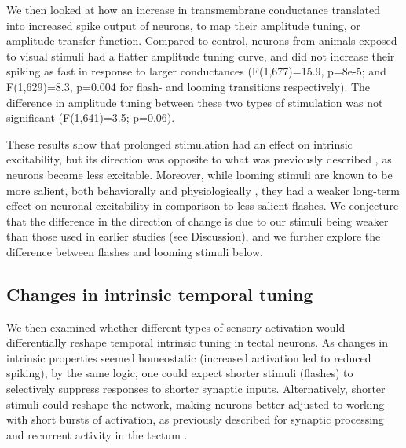 \documentclass{article}
\begin{document}
We then looked at how an increase in transmembrane conductance translated into increased spike output of neurons, to map their amplitude tuning, or amplitude transfer function. Compared to control, neurons from animals exposed to visual stimuli had a flatter amplitude tuning curve, and did not increase their spiking as fast in response to larger conductances (F(1,677)=15.9, p=8e-5; and F(1,629)=8.3, p=0.004 for flash- and looming transitions respectively). The difference in amplitude tuning between these two types of stimulation was not significant (F(1,641)=3.5; p=0.06).

These results show that prolonged stimulation had an effect on intrinsic excitability, but its direction was opposite to what was previously described \citep{aizenman2003,ciarleglio2015}, as neurons became less excitable. Moreover, while looming stimuli are known to be more salient, both behaviorally and physiologically \citep{khakhalin2014}, they had a weaker long-term effect on neuronal excitability in comparison to less salient flashes. We conjecture that the difference in the direction of change is due to our stimuli being weaker than those used in earlier studies (see Discussion), and we further explore the difference between flashes and looming stimuli below.

\subsection*{Changes in intrinsic temporal tuning}

We then examined whether different types of sensory activation would differentially reshape temporal intrinsic tuning in tectal neurons. As changes in intrinsic properties seemed homeostatic (increased activation led to reduced spiking), by the same logic, one could expect shorter stimuli (flashes) to selectively suppress responses to shorter synaptic inputs. Alternatively, shorter stimuli could reshape the network, making neurons better adjusted to working with short bursts of activation, as  previously described for synaptic processing \citep{aizenman2007} and recurrent activity in the tectum \citep{pratt2007,shen2011}.
\end{document}
